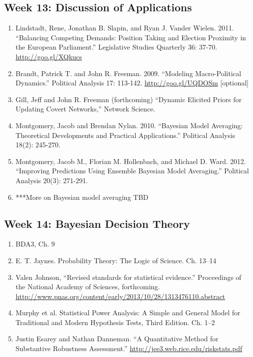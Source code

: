\documentclass[11pt, leqno, fleqn]{article}
\begin{document}
\subsection*{Week 13: Discussion of Applications}
	\begin{enumerate}
	\item[] Lindstadt, Rene, Jonathan B. Slapin, and Ryan J. Vander Wielen. 2011. ``Balancing Competing Demands: Position Taking and Election Proximity in the European Parliament.'' Legislative Studies Quarterly 36: 37-70. \url{http://goo.gl/XQkucs}
	\item[] Brandt, Patrick T. and John R. Freeman. 2009. ``Modeling Macro-Political Dynamics.'' Political Analysis 17: 113-142. \url{http://goo.gl/UQDOSm} [optional]
 	\item[] Gill, Jeff and John R. Freeman (forthcoming) ``Dynamic Elicited Priors for
 Updating Covert Networks,'' Network Science.
	\item[] Montgomery, Jacob and Brendan Nylan. 2010. ``Bayesian Model Averaging:
 Theoretical Developments and Practical Applications.'' Political Analysis 18(2):
 245-270.
 	\item[] Montgomery, Jacob M., Florian M. Hollenbach, and Michael D. Ward. 2012.
``Improving Predictions Using Ensemble Bayesian Model Averaging.''
Political Analysis 20(3): 271-291.
	\item[] ***More on Bayesian model averaging TBD
	\end{enumerate}
\subsection*{Week 14: Bayesian Decision Theory}
	\begin{enumerate}
	\item[] BDA3, Ch. 9
	\item[] E. T. Jaynes. Probability Theory: The Logic of Science. Ch. 13--14
	\item[] Valen Johnson, ``Revised standards for statistical evidence.'' Proceedings of the National Academy of Sciences, forthcoming. \url{http://www.pnas.org/content/early/2013/10/28/1313476110.abstract}
	\item[] Murphy et al. Statistical Power Analysis: A Simple and General Model for Traditional and Modern Hypothesis Tests, Third Edition. Ch. 1--2
	\item[] Justin Esarey and Nathan Danneman. ``A Quantitative Method for Substantive Robustness Assessment.'' \url{http://jee3.web.rice.edu/riskstats.pdf}
	\end{enumerate}
\end{document}
